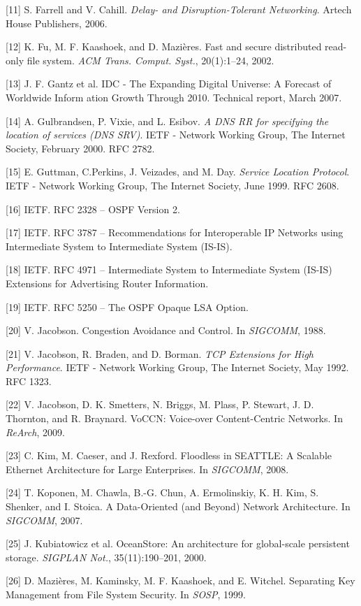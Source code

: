 [11] S. Farrell and V. Cahill. \emph{Delay- and Disruption-Tolerant Networking}. Artech House Publishers, 2006.

[12] K. Fu, M. F. Kaashoek, and D. Mazières. Fast and secure distributed read-only file system. \emph{ACM Trans. Comput. Syst.}, 20(1):1–24, 2002.

[13] J. F. Gantz et al. IDC - The Expanding Digital Universe: A Forecast of Worldwide Inform ation Growth Through 2010. Technical report, March 2007.

[14] A. Gulbrandsen, P. Vixie, and L. Esibov. \emph{A DNS RR for specifying the location of services (DNS SRV)}. IETF - Network Working Group, The Internet Society, February 2000. RFC 2782.

[15] E. Guttman, C.Perkins, J. Veizades, and M. Day. \emph{Service Location Protocol}. IETF - Network Working Group, The Internet Society, June 1999. RFC 2608.

[16] IETF. RFC 2328 – OSPF Version 2.

[17] IETF. RFC 3787 – Recommendations for Interoperable IP
Networks using Intermediate System to Intermediate System (IS-IS).

[18] IETF. RFC 4971 – Intermediate System to Intermediate System (IS-IS) Extensions for Advertising Router Information.

[19] IETF. RFC 5250 – The OSPF Opaque LSA Option.

[20] V. Jacobson. Congestion Avoidance and Control. In
\emph{SIGCOMM}, 1988.

[21] V. Jacobson, R. Braden, and D. Borman. \emph{TCP Extensions for
High Performance}. IETF - Network Working Group, The
Internet Society, May 1992. RFC 1323.

[22] V. Jacobson, D. K. Smetters, N. Briggs, M. Plass, P. Stewart,
J. D. Thornton, and R. Braynard. VoCCN: Voice-over
Content-Centric Networks. In \emph{ReArch}, 2009.

[23] C. Kim, M. Caeser, and J. Rexford. Floodless in SEATTLE:
A Scalable Ethernet Architecture for Large Enterprises. In
\emph{SIGCOMM}, 2008.

[24] T. Koponen, M. Chawla, B.-G. Chun, A. Ermolinskiy, K. H.
Kim, S. Shenker, and I. Stoica. A Data-Oriented (and
Beyond) Network Architecture. In \emph{SIGCOMM}, 2007.

[25] J. Kubiatowicz et al. OceanStore: An architecture for
global-scale persistent storage. \emph{SIGPLAN Not.},
35(11):190–201, 2000.

[26] D. Mazières, M. Kaminsky, M. F. Kaashoek, and E. Witchel.
Separating Key Management from File System Security. In
\emph{SOSP}, 1999.

